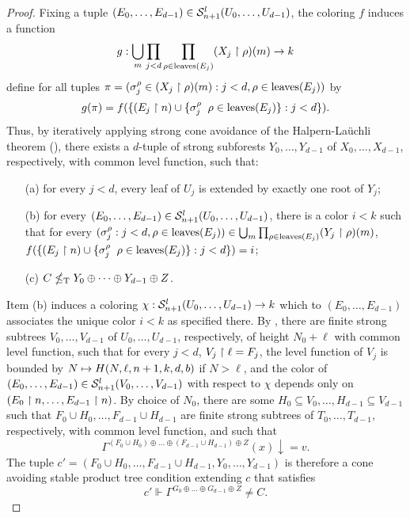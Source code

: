 \begin{proof}
Fixing a tuple $(E_0, \dots, E_{d-1}) \in \mathcal{S}^{l}_{n+1}({U_0, \dots, U_{d-1}})$,
the coloring $f$ induces a function 
$$
g: \bigcup_m \prod_{j < d} \prod_{\rho \in \operatorname{leaves}(E_j)} (X_j \upharpoonright \rho)(m) \to k
$$
define for all tuples $\pi = (\sigma^\rho_j \in (X_j \upharpoonright \rho)(m): j < d, \rho \in \operatorname{leaves}(E_j))$ by
\[
	g(\pi) = f(\{ (E_j \upharpoonright n) \cup \{\sigma^\rho_j\:\  \rho \in \operatorname{leaves}(E_j)\}:  j < d\}).
\]
Thus, by iteratively applying strong cone avoidance of the Halpern-La\"{u}chli theorem (), there exists a $d$-tuple of strong subforests $Y_0, \dots, Y_{d-1}$ of $X_0, \dots, X_{d-1}$, respectively, with common level function, such that:
\begin{itemize}
	\item[(a)] for every $j < d$, every leaf of $U_j$ is extended by exactly one root of $Y_j$;
	\item[(b)] for every $(E_0, \dots, E_{d-1}) \in \mathcal{S}^{l}_{n+1}({U_0, \dots, U_{d-1}})$, there is a color $i < k$ such that for every $( \sigma^\rho_j: j < d, \rho \in \operatorname{leaves}(E_j) ) \in \bigcup_m \prod_{\rho \in \operatorname{leaves}(E_j)} (Y_j \upharpoonright \rho)(m)$, $f(\{ (E_j \upharpoonright n) \cup \{\sigma^\rho_j\:\  \rho \in \operatorname{leaves}(E_j)\}:  j < d\}) = i$;
	\item[(c)] $C \nleq_{\text{\upshape T}} Y_0 \oplus \dots \oplus Y_{d-1} \oplus Z$.
\end{itemize}
Item (b) induces a coloring $\chi: \mathcal{S}^{l}_{n+1}({U_0,\dots,U_{d-1}})\to k$
which to $(E_0, \dots, E_{d-1})$ associates the unique color $i < k$ as specified there.
By , there are finite strong subtrees $V_0, \dots, V_{d-1}$ of $U_0, \dots, U_{d-1}$, respectively, of height $N_0 + \ell$ with common level function, such that for every $j < d$, $V_j \upharpoonright \ell = F_j$, the level function of $V_j$ is bounded by $N \mapsto H(N,\ell,n+1, k,d, b)$ if $N > \ell$, and the color of $(E_0, \dots, E_{d-1}) \in \mathcal{S}^{l}_{n+1}({V_0,\dots,V_{d-1}})$ with respect to $\chi$ depends only on $(E_0 \upharpoonright n, \dots, E_{d-1} \upharpoonright n)$. By choice of $N_0$, there are some $H_0 \subseteq V_0, \dots, H_{d-1} \subseteq V_{d-1}$
	such that $F_0 \cup H_0, \dots, F_{d-1} \cup H_{d-1}$ are finite strong subtrees of $T_0, \dots, T_{d-1}$, respectively, with common level function, and such that
$$
\Gamma^{(F_0 \cup H_0) \oplus \dots \oplus (F_{d-1} \cup H_{d-1}) \oplus Z}(x)\downarrow = v.
$$
The tuple $c' = (F_0 \cup H_0, \dots, F_{d-1} \cup H_{d-1}, Y_0, \dots, Y_{d-1})$
	is therefore a cone avoiding stable product tree condition extending $c$ that satisfies
$$
c' \Vdash \Gamma^{G_0 \oplus \dots \oplus G_{d-1} \oplus Z} \neq C.
$$


\end{proof}
